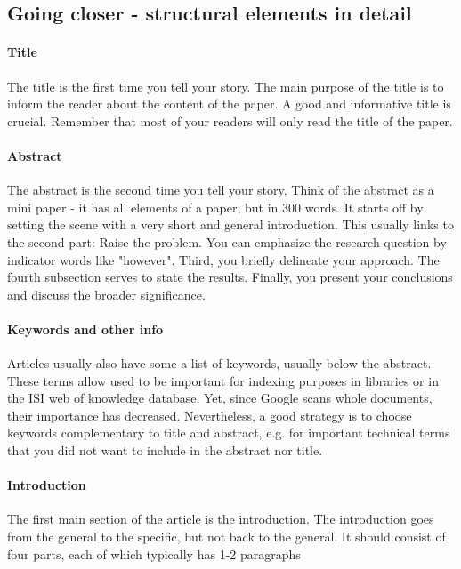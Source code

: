 \documentclass{tufte-book}
\begin{document}
\subsection{Going closer - structural elements in detail}

\paragraph{Title} The title is the first time you tell your story. The main purpose of the title is to inform the reader about the content of the paper. A good and informative title is crucial. Remember that most of your readers will only read the title of the paper.

\paragraph{Abstract}The abstract is the second time you tell your story. Think of the abstract as a mini paper - it has all elements of a paper, but in 300 words. It starts off by setting the scene with a very short and general introduction. This usually links to the second part: Raise the problem. You can emphasize the research question by indicator words like "however". Third, you briefly delineate your approach. The fourth subsection serves to state the results. Finally, you present your conclusions and discuss the broader significance.\\

\paragraph{Keywords and other info}Articles usually also have some a list of keywords, usually below the abstract. These terms allow used to be important for indexing purposes in libraries or in the ISI web of knowledge database. Yet, since Google scans whole documents, their importance has decreased. Nevertheless, a good strategy is to choose keywords complementary to title and abstract, e.g. for important technical terms that you did not want to include in the abstract nor title.


\paragraph{Introduction} The first main section of the article is the introduction. The introduction goes from the general to the specific, but not back to the general. It should consist of four parts, each of which typically has 1-2 paragraphs
\end{document}
